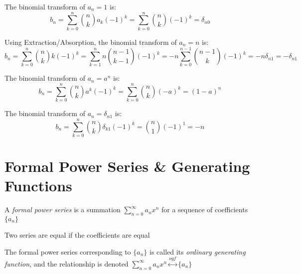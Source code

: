 \documentclass[a4paper]{article}
\begin{document}
\begin{example}
The binomial transform of $a_n=1$ is:
\begin{equation*}
b_n=\sum_{k=0}^n\binom nka_k(-1)^k=\sum_{k=0}^n\binom nk(-1)^k=\delta_{n0}
\end{equation*}
\end{example}

\begin{example}
Using Extraction/Absorption, the binomial transform of $a_n=n$ is:
\begin{equation*}
b_n=\sum_{k=0}^n\binom nkk(-1)^k
=\sum_{k=1}^nn\binom{n-1}{k-1}(-1)^k
=-n\sum_{k=0}^{n-1}\binom{n-1}{k}(-1)^k
=-n\delta_{n1}
=-\delta_{n1}
\end{equation*}
\end{example}

\begin{example}
The binomial transform of $a_n=a^n$ is:
\begin{equation*}
b_n=\sum_{k=0}^n\binom nka^k(-1)^k=\sum_{k=0}^n\binom nk(-a)^k=(1-a)^n
\end{equation*}
\end{example}

\begin{example}
The binomial transform of $a_n=\delta_{n1}$ is:
\begin{equation*}
b_n=\sum_{k=0}^n\binom nk\delta_{k1}(-1)^k=\binom n1(-1)^1=-n
\end{equation*}
\end{example}

\section{Formal Power Series \& Generating Functions}

\begin{definition}
A \emph{formal power series} is a summation $\sum_{n=0}^\infty a_nx^n$ for a sequence of coefficients $\{a_n\}$
\begin{arrows}
\item Two series are equal if the coefficients are equal
\item The formal power series corresponding to $\{a_n\}$ is called its \emph{ordinary generating function}, and the relationship is denoted $\sum_{n=0}^\infty a_nx^n\overset{ogf}\longleftrightarrow\{a_n\}$
\end{arrows}
\end{definition}
\end{document}
